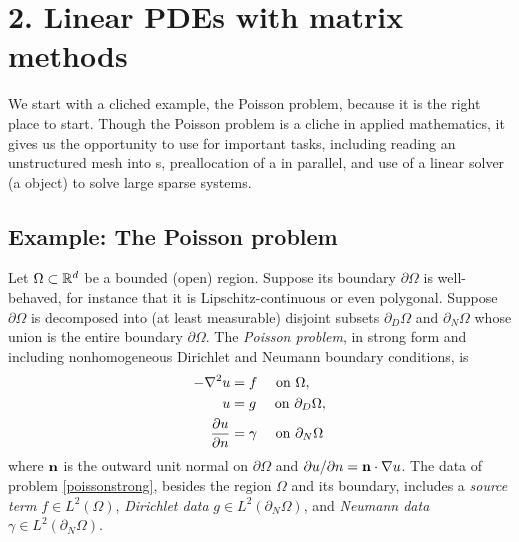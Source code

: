 
\chapter{2. Linear PDEs with matrix methods}

We start with a cliched example, the Poisson problem, because it is the right place to start.  Though the Poisson problem is a cliche in applied mathematics, it gives us the opportunity to use \PETSc for important tasks, including reading an unstructured mesh into \PETSc \pVec s, preallocation of a \pMat in parallel, and use of a linear solver (a \pKSP object) to solve large sparse systems.

\section{Example: The Poisson problem}

Let $\Omega \subset \mathbb{R}^d$ be a bounded (open) region.  Suppose its boundary $\partial\Omega$ is well-behaved, for instance that it is Lipschitz-continuous \citep[section 1.2]{Ciarlet} or even polygonal.  Suppose $\partial\Omega$ is decomposed into (at least measurable) disjoint subsets $\partial_D \Omega$ and $\partial_N \Omega$ whose union is the entire boundary $\partial \Omega$.  The \emph{Poisson problem}, in strong form and including nonhomogeneous Dirichlet and Neumann boundary conditions, is
\begin{align}
- \nabla^2 u &= f \quad \text{ on } \Omega, \label{poissonstrong} \\
u &= g \quad \text{ on } \partial_D \Omega, \notag \\
\frac{\partial u}{\partial n} &= \gamma \quad \text{ on } \partial_N \Omega \notag
\end{align}
where $\mathbf{n}$ is the outward unit normal on $\partial \Omega$ and $\partial u/\partial n = \mathbf{n} \cdot \nabla u$.  The data of problem \eqref{poissonstrong}, besides the region $\Omega$ and its boundary, includes a \emph{source term} $f\in L^2(\Omega)$, \emph{Dirichlet data} $g\in L^2(\partial_N \Omega)$, and \emph{Neumann data} $\gamma\in L^2(\partial_N \Omega)$.

